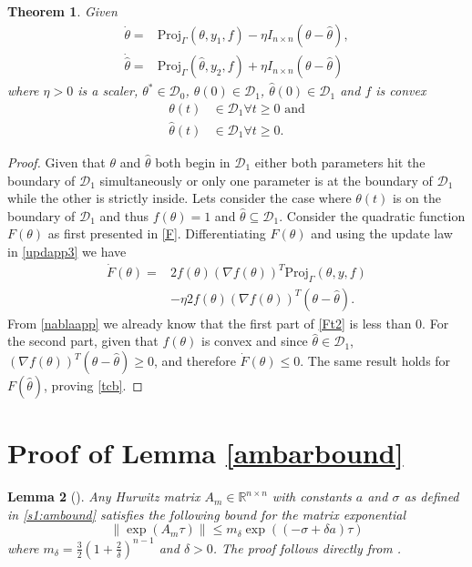 \documentclass[10pt,journal]{IEEEtran}
\theoremstyle{plain}%
\newtheorem{thm}{Theorem}%
\newtheorem{lem}[thm]{Lemma}
\theoremstyle{definition}
\newcommand{\be}[0]{\begin{equation}}
\newcommand{\ee}[0]{\end{equation}}
\newcommand{\ben}[0]{\begin{equation*}}
\newcommand{\een}[0]{\end{equation*}}
\newcommand{\norms}[1]{\lVert#1\rVert}
\newcommand{\normB}[0]{\norms}
\let\norm=\normB
\renewcommand{\Re}[0]{\mathbb R}
\begin{document}
\begin{thm}\label{thm:projv2}Given 
\be\begin{split}\label{updapp3}
\dot \theta=& \text{Proj}_\Gamma(\theta,y_1,f) - \eta I_{n\times n}(\theta - \hat \theta), \\
\dot {\hat \theta}=& \text{Proj}_\Gamma(\hat\theta,y_2,f) +\eta I_{n\times n} (\theta -\hat\theta)
\end{split}\ee
where $\eta>0$ is a scaler, $\theta^*\in{\mathcal D}_0$, $\theta(0)\in{\mathcal D}_1$, $\hat \theta(0)\in{\mathcal D}_1$ and $f$ is convex
 \be\begin{split} \label{tcb} \theta(t)&\in{\mathcal D}_1 \forall t\geq 0 \text{ and} \\
\hat \theta(t)&\in{\mathcal D}_1 \forall t\geq 0.
\end{split}\ee
\end{thm}
\begin{proof}
Given that $\theta$ and $\hat \theta$ both begin in $\mathcal D_1$ either both parameters hit the boundary of $\mathcal D_1$ simultaneously or only one parameter is at the boundary of $\mathcal D_1$ while the other is strictly inside. Lets consider the case where $\theta(t)$ is on the boundary of $\mathcal D_1$ and thus $f(\theta)=1$ and $\hat \theta \subseteq \mathcal D_1$. Consider the quadratic function $F(\theta)$ as first presented in \eqref{F}. Differentiating $F(\theta)$ and using the update law in \eqref{updapp3} we have
\be\begin{split}\label{Ft2}
\dot F(\theta) =& 2f(\theta) \left(\nabla f(\theta)\right)^T\text{Proj}_\Gamma(\theta,y,f) \\&- \eta 2 f(\theta)\left(\nabla f(\theta)\right)^T(\theta-\hat\theta).
\end{split}\ee
From \eqref{nablaapp} we already know that the first part of \eqref{Ft2} is less than 0. For the second part, given that $f(\theta)$ is convex and since $\hat\theta\in \mathcal D_1$, $\left(\nabla f(\theta)\right)^T(\theta-\hat\theta)\geq 0$, and therefore $\dot F(\theta) \leq 0$. The same result holds for $F(\hat\theta)$, proving \eqref{tcb}.
 \end{proof}

\section{Proof of Lemma \ref{ambarbound}}\label{pf:ambound}


\begin{lem}[{\cite[Lemma 1]{sol94}}]
Any Hurwitz matrix ${A_m\in \Re^{n\times n}}$ with constants $a$ and $\sigma$ as defined in \eqref{s1:ambound} satisfies the following bound for the matrix exponential  
\ben
\norm {\exp(A_m\tau)} \leq m_\delta \exp((-\sigma+\delta a) \tau)
\een
where 
$m_\delta= \frac{3}{2}\left(1+\frac 2 \delta\right)^{n-1}$ and $\delta>0$. The proof follows directly from \cite{sol94}.\end{lem}
\end{document}
